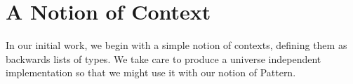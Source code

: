 \section{A Notion of Context}


In our initial work, we begin with a simple notion of contexts, defining
them as backwards lists of types. We take care to produce a universe independent
implementation so that we might use it with our notion of Pattern.

\begin{code}%
\>[0]\AgdaSpace{}%
\AgdaSpace{}%
\AgdaSymbol{\{}\AgdaSymbol{\}}\AgdaSpace{}%
\AgdaSymbol{(}\AgdaSpace{}%
\AgdaSymbol{:}\AgdaSpace{}%
\AgdaSpace{}%
\AgdaSymbol{)}\AgdaSpace{}%
\AgdaSymbol{:}\AgdaSpace{}%
\AgdaSpace{}%
\AgdaSpace{}%
\<%
\\
\>[0][@{}l@{\AgdaIndent{0}}]%
\>[2]%
\>[7]\AgdaSymbol{:}\AgdaSpace{}%
\AgdaSpace{}%
\<%
\\
%
\>[2]\AgdaOperator{\AgdaInductiveConstructor{\AgdaUnderscore{}-,\AgdaUnderscore{}}}\AgdaSpace{}%
\AgdaSymbol{:}\AgdaSpace{}%
\AgdaSpace{}%
\AgdaSpace{}%
\AgdaSpace{}%
\AgdaSpace{}%
\AgdaSpace{}%
\AgdaSpace{}%
\<%
\end{code}


